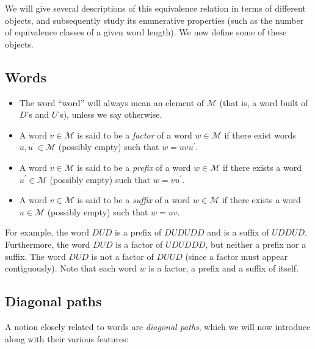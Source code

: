 \documentclass[numbers=enddot,12pt,final,onecolumn,notitlepage]{scrartcl}%
\theoremstyle{definition}
\newcommand{\M}{\mathcal{M}}
\begin{document}
We will give several descriptions of this equivalence relation in terms of different objects, and subsequently study its enumerative properties (such as the number of equivalence classes of a given word length).
We now define some of these objects.

\subsection{Words}

\begin{itemize}
\item The word ``word'' will always mean an element of $\M$ (that is, a word built of $D$'s and $U$'s), unless we say otherwise.

\item A word $v\in\M$ is said to be a \emph{factor} of a word
$w\in\M$ if there exist words $u,u^{\prime}\in\M$ (possibly
empty) such that $w=uvu^{\prime}$.

\item A word $v\in\M$ is said to be a \emph{prefix} of a word
$w\in\M$ if there exists a word $u^{\prime}\in\M$ (possibly
empty) such that $w=vu^{\prime}$.

\item A word $v\in\M$ is said to be a \emph{suffix} of a word
$w\in\M$ if there exists a word
$u\in\M$ (possibly
empty) such that $w=uv$.
\end{itemize}

For example, the word $DUD$ is a prefix of $DUDUDD$ and is a suffix of $UDDUD$.
Furthermore, the word $DUD$ is a factor of $UDUDDD$, but neither a prefix nor a suffix.
The word $DUD$ is not a factor of $DUUD$ (since a factor must appear contiguously).
Note that each word $w$ is a factor, a prefix and a suffix of itself.

\subsection{Diagonal paths}

A notion closely related to words are \emph{diagonal paths}, which we will now introduce along with their various features:
\end{document}

